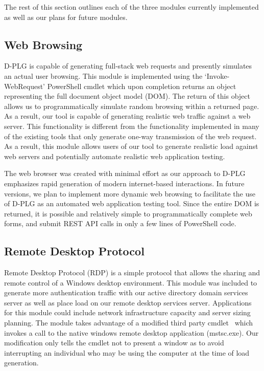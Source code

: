 The rest of this section outlines each of the three modules currently
implemented as well as our plans for future modules.

\subsection{Web Browsing} 
D-PLG is capable of generating full-stack web requests and presently simulates
an actual user browsing.  This module is implemented using the
`Invoke-WebRequest' PowerShell cmdlet which upon completion returns an object
representing the full document object model (DOM).  The return of this object
allows us to programmatically simulate random browsing within a returned page.
As a result, our tool is capable of generating realistic web traffic against a
web server.  This functionality is different from the functionality implemented
in many of the existing tools that only generate one-way transmission of the
web request.  As a result, this module allows users of our tool to generate
realistic load against web servers and potentially automate realistic web
application testing.

The web browser was created with minimal effort as our approach to D-PLG
emphasizes rapid generation of modern internet-based interactions.  In future
versions, we plan to implement more dynamic web browsing to facilitate the use
of D-PLG as an automated web application testing tool.  Since the entire DOM is
returned, it is possible and relatively simple to programmatically complete web
forms, and submit REST API calls in only a few lines of PowerShell code.
 
\subsection{Remote Desktop Protocol} 
Remote Desktop Protocol (RDP) is a simple protocol that allows the sharing and
remote control of a Windows desktop environment.  This module was included to
generate more authentication traffic with our active directory domain services
server as well as place load on our remote desktop services server.
Applications for this module could include network infrastructure capacity and
server sizing planning.  The module takes advantage of a modified third party
cmdlet~\cite{brasser15} which invokes a call to the native windows remote
desktop application (mstsc.exe).  Our modification only tells the cmdlet not to
present a window as to avoid interrupting an individual who may be using the
computer at the time of load generation.


